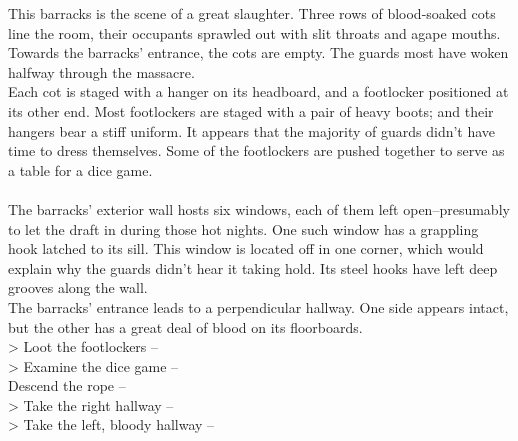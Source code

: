 This barracks is the scene of a great slaughter. Three rows of blood-soaked cots line the room, their occupants sprawled out with slit throats and agape mouths. Towards the barracks' entrance, the cots are empty. The guards most have woken halfway through the massacre.\\

Each cot is staged with a hanger on its headboard, and a footlocker positioned at its other end. Most footlockers are staged with a pair of heavy boots; and their hangers bear a stiff uniform. It appears that the majority of guards didn't have time to dress themselves. Some of the footlockers are pushed together to serve as a table for a dice game.\\
\\

The barracks' exterior wall hosts six windows, each of them left open--presumably to let the draft in during those hot nights. One such window has a grappling hook latched to its sill. This window is located off in one corner, which would explain why the guards didn't hear it taking hold. Its steel hooks have left deep grooves along the wall.\\

The barracks’ entrance leads to a perpendicular hallway. One side appears intact, but the other has a great deal of blood on its floorboards.\\

> Loot the footlockers -- \\
> Examine the dice game -- \\
 Descend the rope -- \\
> Take the right hallway -- \\
> Take the left, bloody hallway -- 